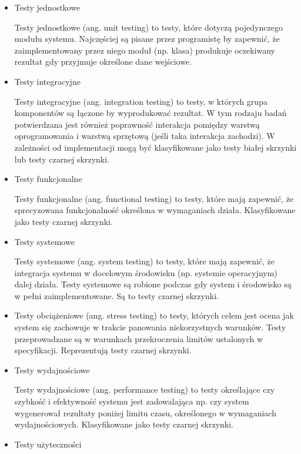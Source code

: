 \begin{itemize}
\item
Testy jednostkowe

Testy jednostkowe (ang. unit testing) to testy, które dotyczą pojedynczego modułu systemu. Najczęściej są pisane przez programistę by zapewnić, że zaimplementowany przez niego moduł (np. klasa) produkuje oczekiwany rezultat gdy przyjmuje określone dane wejściowe.

\item
Testy integracyjne

Testy integracyjne (ang. integration testing) to testy, w których grupa komponentów są łączone by wyprodukować rezultat. W tym rodzaju badań potwierdzana jest również poprawność interakcja pomiędzy warstwą oprogramowania i warstwą sprzętową (jeśli taka interakcja zachodzi). W zależności od implementacji mogą być klasyfikowane jako testy białej skrzynki lub testy czarnej skrzynki.

\item
Testy funkcjonalne

Testy funkcjonalne (ang. functional testing) to testy, które mają zapewnić, że sprecyzowana funkcjonalność określona w wymaganiach działa.  Klasyfikowane jako testy czarnej skrzynki.

\item
Testy systemowe

Testy systemowe (ang. system testing) to testy, które mają zapewnić, że integracja systemu w docelowym środowisku (np. systemie operacyjnym) dalej działa. Testy systemowe są robione podczas gdy system i środowisko są w pełni zaimplementowane. Są to testy czarnej skrzynki.

\item
Testy obciążeniowe (ang. stress testing) to testy, których celem jest ocena jak system się zachowuje w trakcie panowania niekorzystnych warunków. Testy przeprowadzane są w warunkach przekroczenia limitów ustalonych w specyfikacji. Reprezentują testy czarnej skrzynki.

\item
Testy wydajnościowe

Testy wydajnościowe (ang. performance testing) to testy określające czy szybkość i efektywność systemu jest zadowalająca np. czy system wygenerował rezultaty poniżej limitu czasu, określonego w wymaganiach wydajnościowych. Klasyfikowane jako testy czarnej skrzynki.

\item
Testy użyteczności


\end{itemize}
